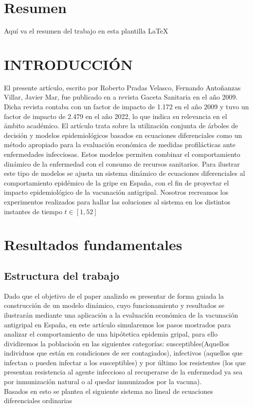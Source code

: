 \documentclass{wscpaperproc}
\theoremstyle{wsc}
\begin{document}
  

\maketitle
\newpage

\section*{Resumen}
Aqu\'i va el resumen del trabajo en esta plantilla  \LaTeX\ 

\section{INTRODUCCI\'ON}
El presente art\'iculo, escrito por Roberto Pradas Velasco, Fernando Antoñanzas Villar, Javier Mar, fue publicado en a revista Gaceta Sanitaria en el año 2009. 
Dicha revista  contaba con un factor de impacto de 1.172 en el a\~no 2009 y tuvo un factor de impacto de 2.479 en el a\~no 2022, lo que indica su 
relevancia en el \'ambito acad\'emico.
El art\'iculo trata sobre la utilizaci\'on conjunta de \'arboles de decisi\'on y modelos epidemiol\'ogicos basados en ecuaciones
diferenciales como un m\'etodo apropiado para la evaluaci\'on econ\'omica de medidas profil\'acticas ante
enfermedades infecciosas. Estos modelos permiten combinar el comportamiento din\'amico de la
enfermedad con el consumo de recursos sanitarios. Para ilustrar este tipo de modelos se ajusta un sistema
din\'amico de ecuaciones diferenciales al comportamiento epid\'emico de la gripe en España, con el fin de
proyectar el impacto epidemiol\'ogico de la vacunaci\'on antigripal. Nosotros recreamos los experimentos realizados para hallar las soluciones 
al sistema en los distintos instantes de tiempo $t \in [1,52] $
\label{sec:intro}

\section{Resultados fundamentales}
\subsection{Estructura del trabajo}
Dado que el objetivo de el paper analizdo es presentar de forma guiada la
construcción de un modelo dinámico, cuyo funcionamiento y resultados se ilustrarán mediante una aplicación a la evaluación
económica de la vacunación antigripal en España, en este art\'iculo simularemos los pasos
mostrados para analizar el comportamiento de una hip\'otetica epidemia gripal,
para ello dividiremos la poblacio\'on en las siguientes categor\'ias:
susceptibles(Aquellos individuos que están en condiciones de ser contagiados),
infectivos (aquellos que infectan o pueden
infectar a los susceptibles) y por último los resistentes (los que presentan
resistencia al agente infeccioso al recuperarse de la enfermedad ya sea por inmunización natural
o al quedar inmunizados por la vacuna).
\\
Basados en esto se plantea el siguiente sistema no lineal de ecuaciones diferenciales ordinarias
\end{document}
